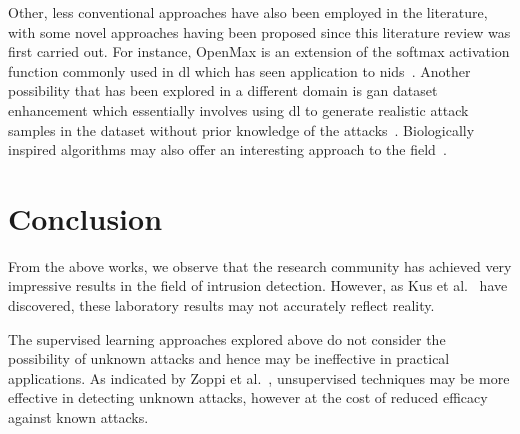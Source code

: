 Other, less conventional approaches have also been employed in the literature,
with some novel approaches having been proposed since this literature review
was first carried out. For instance, OpenMax is an extension of the softmax
activation function commonly used in \gls{dl} which has seen application to
\gls{nids}~\cite{openmax}. Another possibility that has been explored in a
different domain is \gls{gan} dataset enhancement which essentially involves
using \gls{dl} to generate realistic attack samples in the dataset without
prior knowledge of the attacks~\cite{gan_enhancement}. Biologically inspired
algorithms may also offer an interesting approach to the field~\cite{AIm}.

\section{Conclusion}%
\label{sec:conclusion}
From the above works, we observe that the research community has achieved
very impressive results in the field of intrusion detection. However, as Kus et
al.~\cite{Kus} have discovered, these laboratory results may not accurately
reflect reality.

The supervised learning approaches explored above do not consider the
possibility of unknown attacks and hence may be ineffective in practical
applications. As indicated by Zoppi et al.~\cite{Zoppi}, unsupervised
techniques may be more effective in detecting unknown attacks, however at the
cost of reduced efficacy against known attacks.
